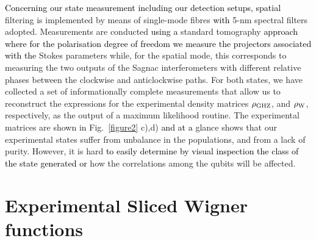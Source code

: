 \documentclass[pra,reprint,showkeys,showpacs,times,superscriptaddress]{revtex4-1}
\newcommand{\red}{\textcolor{black}}
\begin{document}
\red{Concerning our state measurement including our detection setups, spatial} filtering is implemented by means of single-mode fibres \red{with} 5-nm spectral filters adopted. Measurements are conducted \red{using a} standard tomography \red{approach where for the polarisation degree of freedom we measure the projectors associated with the} Stokes parameters while, for the spatial mode, this corresponds to measuring the two outputs of the Sagnac interferometers with different relative phases between the clockwise and anticlockwise paths. 
For both states, we have collected a set of informationally complete measurements that allow us to reconstruct the expressions for the experimental density matrices $\rho_{\rm{GHZ}}$, and $\rho_{\rm{W}}$, respectively, as the output of a maximum likelihood routine. The experimental matrices are shown in Fig.~\ref{figure2} c),d) \red{and at a} glance shows that our experimental states suffer from unbalance in the populations, and from a lack of purity. However, it is hard  \red{to easily determine by visual inspection the class of the state generated or} how the correlations among the qubits will be affected. 

\section{Experimental Sliced Wigner functions}
\end{document}
